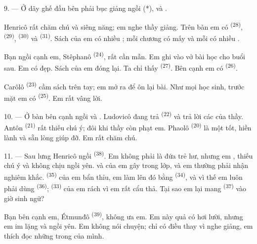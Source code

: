 \VUsaut{2.4mm}

\VUsaut{3.0mm}

9. --- Ở dãy ghế đầu bên phải bục giảng ngồi  (*),  và
.

Henricô rất chăm chú và siêng năng; em nghe thầy giảng. Trên bàn em có 
\textsuperscript{(28)},  \textsuperscript{(29)}, 
\textsuperscript{(30)} và  \textsuperscript{(31)}. Sách của em có nhiều
; mỗi chương có mấy  và mỗi  có nhiều
.

Bạn ngồi cạnh em, Stêphanô \textsuperscript{(24)}, rất cần mẫn. Em ghi vào vở bài học
cho buổi sau. Em có  đẹp. Sách của em đóng lại. Ta chỉ thấy
 \textsuperscript{(27)}. Bên cạnh em có 
\textsuperscript{(26)}.

Carôlô \textsuperscript{(23)} cầm sách trên tay; em mở ra để ôn lại bài. Như mọi học
sinh, trước mặt em có  \textsuperscript{(25)}. Em rất vâng lời.

10. --- Ở bàn bên cạnh ngồi  và . Ludovicô đang
trả  \textsuperscript{(22)} và trả lời các  của thầy.
Antôn \textsuperscript{(21)} rất thiếu chú ý; đôi khi thầy còn phạt em. Phaolô
\textsuperscript{(20)} là một  tốt, hiền lành và sẵn lòng giúp đỡ. Em
rất chăm chú.

\VUsaut{4.2mm}
\VUsaut{3.2mm}

11. --- Sau lưng Henricô ngồi  \textsuperscript{(38)}. Em không phải là
đứa trẻ hư, nhưng em , thiếu chú ý và không chịu ngồi yên.
 và  của em gây  trong
lớp, và em thường phải nhận  nghiêm khắc. 
\textsuperscript{(35)} của em bẩn thỉu, em làm  lên đó bằng
 \textsuperscript{(34)}, và vì thế em luôn phải dùng 
\textsuperscript{(36)};  \textsuperscript{(33)} của em rách vì em rất
cẩu thả. Tại sao em lại mang  \textsuperscript{(37)} vào giờ sinh
ngữ?

Bạn bên cạnh em, Étmunđô \textsuperscript{(39)}, không ưa em. Em này quả có hơi lười,
nhưng em im lặng và ngồi yên. Em không nói chuyện; chỉ có điều thay vì nghe giảng, em
thích đọc những  trong  của mình.

